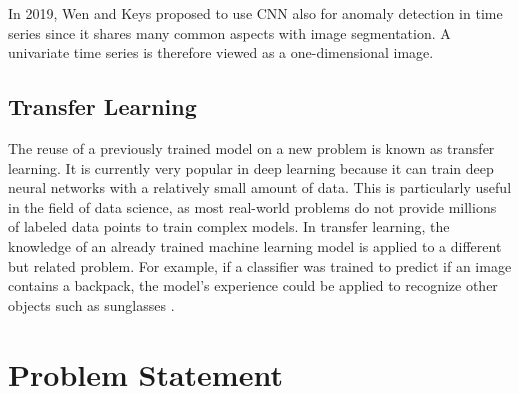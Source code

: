 In 2019, Wen and Keys proposed to use CNN also for anomaly detection in time series since it shares many common aspects with image segmentation. A univariate time series is therefore viewed as a one-dimensional image.\\ 




\subsection{Transfer Learning}
The reuse of a previously trained model on a new problem is known as transfer learning. It is currently very popular in deep learning because it can train deep neural networks with a relatively small amount of data. This is particularly useful in the field of data science, as most real-world problems do not provide millions of labeled data points to train complex models.
In transfer learning, the knowledge of an already trained machine learning model is applied to a different but related problem. For example, if a classifier was trained to predict if an image contains a backpack, the model's experience could be applied to recognize other objects such as sunglasses \parencite{NiklasDonges2020}.

\section{Problem Statement}

